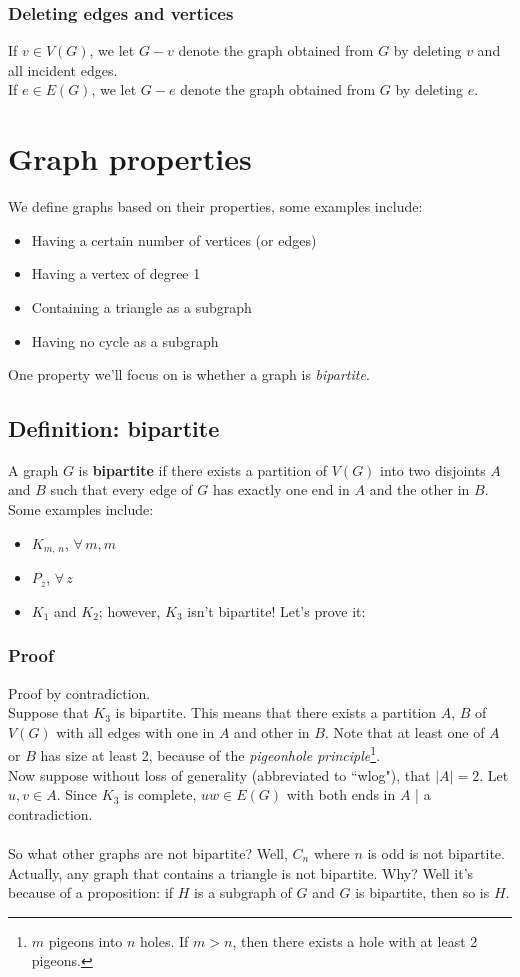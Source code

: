 \documentclass{report}
\begin{document}
\subsubsection{Deleting edges and vertices}
If $v \in  V(G)$, we let $G - v$ denote the graph obtained from $G$ by deleting $v$ and all incident edges.\\
If $e \in  E(G)$, we let $G - e$ denote the graph obtained from $G$ by deleting $e$.
\newpage
\section{Graph properties}
We define graphs based on their properties, some examples include:
\begin{itemize}
\item Having a certain number of vertices (or edges)
\item Having a vertex of degree 1
\item Containing a triangle as a subgraph
\item Having no cycle as a subgraph
\end{itemize}
One property we'll focus on is whether a graph is \textit{bipartite}.
\subsection{Definition: bipartite}
A graph $G$ is \textbf{bipartite} if there exists a partition of $V(G)$ into two disjoints $A$ and $B$ such that every edge of $G$ has exactly one end in $A$ and the other in $B$. Some examples include:
\begin{itemize}
\item $K_{m,\,n}$, $\forall\,m,m$
\item $P_z$, $\forall\,z$
\item $K_1$ and $K_2$; however, $K_3$ isn't bipartite! Let's prove it:
\end{itemize}

\subsubsection{Proof}
Proof by contradiction.\\
Suppose that $K_3$ is bipartite. This means that there exists a partition $A,\,B$ of $V(G)$ with all edges with one in $A$ and other in $B$. Note that at least one of $A$ or $B$ has size at least 2, because of the \textit{pigeonhole principle}\footnote{$m$ pigeons into $n$ holes. If $m > n$, then there exists a hole with at least 2 pigeons.}.\\
Now suppose without loss of generality (abbreviated to ``wlog"), that $\vert A \vert = 2$. Let $u, v \in A$. Since $K_3$ is complete, $uw \in E(G)$ with both ends in $A$ | a contradiction.\\\\
So what other graphs are not bipartite? Well, $C_n$ where $n$ is odd is not bipartite. Actually, any graph that contains a triangle is not bipartite. Why? Well it's because of a proposition: if $H$ is a subgraph of $G$ and $G$ is bipartite, then so is $H$.
\end{document}
